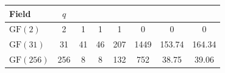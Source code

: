 \begin{tabular}{l@{\hspace*{1em}}S[table-format=3]@{\hspace*{1em}}S[table-format=2]S[table-format=2]S[table-format=3]S[table-format=4]@{\hspace*{1em}}S[table-format=3.2]@{\hspace*{1em}}S[table-format=3.2]}
\toprule
{Field} & {\(q\)} & {} & {} & {} & {} & {} & {} \\
\midrule
$\text{GF}(2)$ & 2 & 1 & 1 & 1 & 0 & 0 & 0 \\
$\text{GF}(31)$ & 31 & 41 & 46 & 207 & 1449 & 153.74 & 164.34 \\
$\text{GF}(256)$ & 256 & 8 & 8 & 132 & 752 & 38.75 & 39.06 \\
\bottomrule
\end{tabular}
